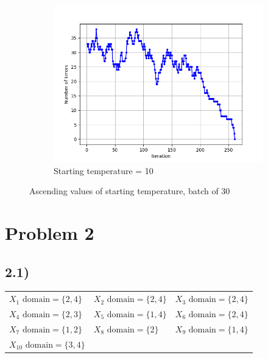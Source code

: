 \documentclass[11pt]{article}
\begin{document}
\begin{figure}[ht]
\begin{subfigure}{0.48\textwidth}
\centering
\includegraphics[width=\textwidth]{images/Figure_5.png}
\caption{Starting temperature = 10}
\label{fig:batch_startT_10}
\end{subfigure}
\caption{Ascending values of starting temperature, batch of 30}
\end{figure}

\newpage
\section*{Problem 2}

\subsection*{2.1)}

\begin{center}
\begin{tabular}{lll}
$X_1 \text{ domain} = \{2,4\}$ & $X_2 \text{ domain} = \{2,4\}$ & $X_3 \text{ domain} = \{2,4\}$ \\
$X_4 \text{ domain} = \{2,3\}$ & $X_5 \text{ domain} = \{1,4\}$ & $X_6 \text{ domain} = \{2,4\}$ \\
$X_7 \text{ domain} = \{1,2\}$ & $X_8 \text{ domain} = \{2\}$ & $X_9 \text{ domain} = \{1,4\}$ \\
$X_{10} \text{ domain} = \{3,4\}$ &                                &
\end{tabular}
\end{center}
\end{document}
